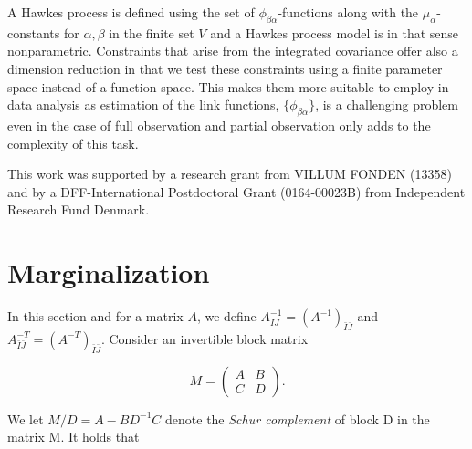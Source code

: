 \documentclass[accepted]{uai2021} %
\begin{document}
A Hawkes process is defined using the set of $\phi_{\beta\alpha}$-functions 
along 
with the $\mu_\alpha$-constants for $\alpha,\beta$ in the finite set $V$ and a 
Hawkes process model is in that sense nonparametric.  Constraints that arise 
from the integrated covariance offer also a dimension reduction in that we  
test these constraints using a finite parameter space instead of a 
function space. This makes them more suitable to employ in data analysis 
as estimation of the link functions, $\{\phi_{\beta\alpha} \}$, is a 
challenging problem even in the case of full 
observation and partial observation only adds to the 
complexity of this task.





\begin{contributions} %

\end{contributions}

\begin{acknowledgements} %
    This work was supported by a research grant from
    VILLUM FONDEN (13358) and by a DFF-International Postdoctoral Grant 
    (0164-00023B) from Independent Research Fund Denmark.
\end{acknowledgements}

\appendix

\section{Marginalization}
\label{sec:marg}

In this section and for a matrix $A$, we define $A_{\bar{I}\bar{J}}^{-1} = 
(A^{-1})_{\bar{I}\bar{J}}$ and 
$A_{\bar{I}\bar{J}}^{-T}=(A^{-T})_{\bar{I}\bar{J}}$. Consider an invertible 
block matrix 

$$
M=
\begin{pmatrix}
A & B \\
C & D
\end{pmatrix}.
$$

We let $M / D = A - BD^{-1}C$ denote the \emph{Schur complement} of block D in 
the matrix M. It holds that
\end{document}

